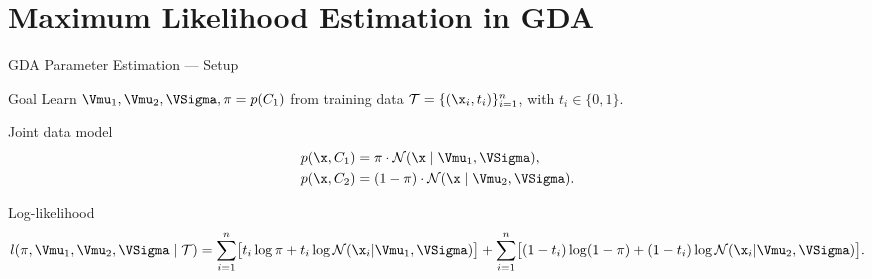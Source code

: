 \section{Maximum Likelihood Estimation in GDA}

\begin{frame}{GDA Parameter Estimation — Setup}
  \begin{block}{Goal}
    Learn $\Vmu_1, \Vmu_2, \VSigma, \pi=p(C_1)$ from training data
    $\mathcal{T}=\{(\x_i,t_i)\}_{i=1}^n$, with $t_i\in\{0,1\}$.
  \end{block}

  \begin{block}{Joint data model}
    \begin{align*}
      p(\x,C_1)&=\pi\cdot\mathcal{N}(\x\mid\Vmu_1,\VSigma),\\
      p(\x,C_2)&=(1-\pi)\cdot\mathcal{N}(\x\mid\Vmu_2,\VSigma).
    \end{align*}
  \end{block}

  \begin{block}{Log-likelihood}
    \[
      l(\pi,\Vmu_1,\Vmu_2,\VSigma\mid\mathcal{T})
      =\sum_{i=1}^n \bigl[t_i\log\pi + t_i\log\mathcal{N}(\x_i|\Vmu_1,\VSigma)\bigr]
       +\sum_{i=1}^n \bigl[(1-t_i)\log(1-\pi)+(1-t_i)\log\mathcal{N}(\x_i|\Vmu_2,\VSigma)\bigr].
    \]
  \end{block}
\end{frame}

